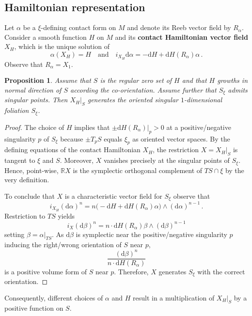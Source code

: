 \documentclass{amsart}
\newtheorem{prop}{Proposition}[subsection]
\theoremstyle{definition}
\newcommand{\rmd}{\mathrm d}
\newcommand{\R}{\mathbb R}
\begin{document}

\subsection{Hamiltonian representation\label{subsec:hamrepr}}


Let $\alpha$ be a $\xi$-defining contact form on $M$
and denote its Reeb vector field by $R_{\alpha}$.
Consider a smooth function $H$ on $M$
and its {\bf contact Hamiltonian vector field} $X_H$,
which is the unique solution of
\[
\alpha(X_H)=H
\quad\text{and}\quad
i_{X_H}\rmd\alpha=
-\rmd H+\rmd H(R_{\alpha})\alpha
\,.
\]
Observe that $R_{\alpha}=X_1$.


\begin{prop}
\label{prop:hamvectischrvect}
Assume that $S$ is the regular zero set of $H$
and that $H$ growths in normal direction of $S$
according the co-orientation.
Assume further that $S_{\xi}$ admits singular points.
Then $X_H|_S$ generates the oriented singular $1$-dimensional foliation $S_{\xi}$.
\end{prop}

\begin{proof}
The choice of $H$ implies that
$\pm\rmd H(R_{\alpha})|_p>0$
at a positive/negative singularity $p$ of $S_{\xi}$
because $\pm T_pS$ equals $\xi_p$
as oriented vector spaces.
By the defining equations of the contact Hamiltonian $X_H$,
the restriction $X=X_H|_S$ is tangent to $\xi$ and $S$.
Moreover,
$X$ vanishes precisely at the singular points of $S_{\xi}$.
Hence, point-wise,
$\R X$ is the symplectic orthogonal complement of $TS\cap\xi$
by the very definition.

To conclude that $X$ is a characteristic vector field for $S_{\xi}$
observe that
\[
i_{X_H}(\rmd\alpha)^n=
n\big(\!-\!\rmd H+\rmd H(R_{\alpha})\alpha\big)
\wedge(\rmd\alpha)^{n-1}
\,.
\]
Restriction to $TS$ yields
\[
i_X(\rmd\beta)^n=
n\cdot\rmd H(R_{\alpha})\beta\wedge(\rmd\beta)^{n-1}
\]
setting $\beta=\alpha|_{TS}$.
As $\rmd\beta$ is symplectic near the positive/negative singularity $p$
inducing the right/wrong orientation of $S$ near $p$,
\[
\frac
{(\rmd\beta)^n}
{n\cdot\rmd H(R_{\alpha})}
\]
is a positive volume form of $S$ near $p$.
Therefore,
$X$ generates $S_{\xi}$ with the correct orientation.
\end{proof}
 

Consequently,
different choices of $\alpha$ and $H$
result in a multiplication of $X_H|_S$ by a positive function on $S$.
\end{document}

